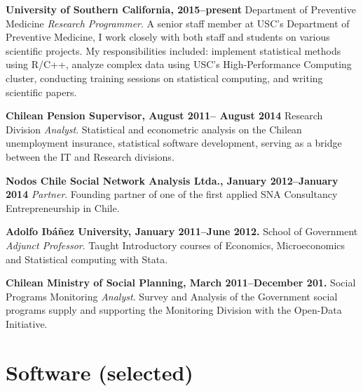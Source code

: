 \documentclass[letterpaper, 11pt]{article}
\renewenvironment{itemize}{
  \begin{list}{}{
    \setlength{\leftmargin}{0.45cm}
  }
}{
  \end{list}
}
\begin{document}
\begin{itemize}
\item \textbf{University of Southern California, 2015--present} Department of Preventive Medicine \emph{Research Programmer}. A senior staff member at USC's Department of Preventive Medicine, I work closely with both staff and students on various scientific projects. My responsibilities included: implement statistical methods using R/C++, analyze complex data using USC's High-Performance Computing cluster, conducting training sessions on statistical computing, and writing scientific papers.
\item \textbf{Chilean Pension Supervisor, August 2011-- August 2014} Research Division \emph{Analyst}. Statistical and econometric analysis on the Chilean unemployment insurance, statistical software development, serving as a bridge between the IT and Research divisions.
\item \textbf{Nodos Chile Social Network Analysis Ltda., January 2012--January 2014} \emph{Partner}.
Founding partner of one of the first applied SNA Consultancy Entrepreneurship in Chile.
\item \textbf{Adolfo Ib\'a\~nez University, January 2011--June 2012.} School of Government \emph{Adjunct Professor}.
Taught Introductory courses of Economics, Microeconomics and Statistical computing with Stata.
\item \textbf{Chilean Ministry of Social Planning, March 2011--December 201.} Social Programs Monitoring \emph{Analyst}.
Survey and Analysis of the Government social programs supply and supporting the Monitoring Division with the Open-Data Initiative.
\end{itemize}

\section*{Software {\small (selected)}}
\end{document}
